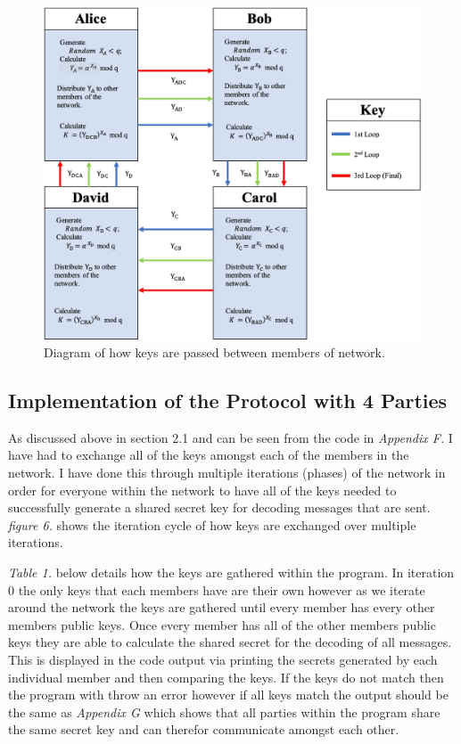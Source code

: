\documentclass[a4paper, twoside, 11pt]{article}
\begin{document}
\begin{figure}[H]
	\centering
	\includegraphics[scale=0.6]{Images/keyExchange.png}
  \caption{Diagram of how keys are passed between members of network.}
\end{figure}


\subsection{Implementation of the Protocol with 4 Parties}
As discussed above in section 2.1 and can be seen from the code in \textit{Appendix F. } I have had to exchange all of the keys amongst each of the members in the network. I have done this through multiple iterations (phases) of the network in order
for everyone within the network to have all of the keys needed to successfully generate a shared secret key for decoding messages that are sent. 
\textit{figure 6.} shows the iteration cycle of how keys are exchanged over multiple iterations.

\textit{Table 1.} below details how the keys are gathered within the program. In iteration 0 the only keys that each
members have are their own however as we iterate around the network the keys are gathered until every member
has every other members public keys. Once every member has all of the other members public keys they are able to calculate the shared secret for the decoding of all messages. This is displayed in the code output via printing the secrets generated by each individual member and then comparing the keys. If the keys do not match then the program with throw an error however if all keys match the output should be the same as \textit{Appendix G} which shows that all parties within the program share the same secret key and can therefor communicate amongst each other. 
\end{document}
